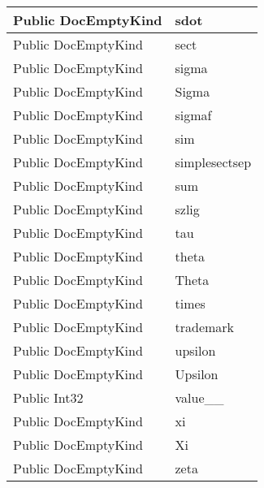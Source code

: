 \documentclass[11pt, oneside, a4paper]{book}
\begin{document}
\begin{center}
\begin{tabular}{| p{3cm} | p{12cm} | }
\hline
 Public  DocEmptyKind &  sdot\hypertarget{SoftwareEngineeringTools.{}Documentation.{}DocEmptyKind.{}sdot}{}\\
\hline
 Public  DocEmptyKind &  sect\hypertarget{SoftwareEngineeringTools.{}Documentation.{}DocEmptyKind.{}sect}{}\\
\hline
 Public  DocEmptyKind &  sigma\hypertarget{SoftwareEngineeringTools.{}Documentation.{}DocEmptyKind.{}sigma}{}\\
\hline
 Public  DocEmptyKind &  Sigma\hypertarget{SoftwareEngineeringTools.{}Documentation.{}DocEmptyKind.{}Sigma}{}\\
\hline
 Public  DocEmptyKind &  sigmaf\hypertarget{SoftwareEngineeringTools.{}Documentation.{}DocEmptyKind.{}sigmaf}{}\\
\hline
 Public  DocEmptyKind &  sim\hypertarget{SoftwareEngineeringTools.{}Documentation.{}DocEmptyKind.{}sim}{}\\
\hline
 Public  DocEmptyKind &  simplesectsep\hypertarget{SoftwareEngineeringTools.{}Documentation.{}DocEmptyKind.{}simplesectsep}{}\\
\hline
 Public  DocEmptyKind &  sum\hypertarget{SoftwareEngineeringTools.{}Documentation.{}DocEmptyKind.{}sum}{}\\
\hline
 Public  DocEmptyKind &  szlig\hypertarget{SoftwareEngineeringTools.{}Documentation.{}DocEmptyKind.{}szlig}{}\\
\hline
 Public  DocEmptyKind &  tau\hypertarget{SoftwareEngineeringTools.{}Documentation.{}DocEmptyKind.{}tau}{}\\
\hline
 Public  DocEmptyKind &  theta\hypertarget{SoftwareEngineeringTools.{}Documentation.{}DocEmptyKind.{}theta}{}\\
\hline
 Public  DocEmptyKind &  Theta\hypertarget{SoftwareEngineeringTools.{}Documentation.{}DocEmptyKind.{}Theta}{}\\
\hline
 Public  DocEmptyKind &  times\hypertarget{SoftwareEngineeringTools.{}Documentation.{}DocEmptyKind.{}times}{}\\
\hline
 Public  DocEmptyKind &  trademark\hypertarget{SoftwareEngineeringTools.{}Documentation.{}DocEmptyKind.{}trademark}{}\\
\hline
 Public  DocEmptyKind &  upsilon\hypertarget{SoftwareEngineeringTools.{}Documentation.{}DocEmptyKind.{}upsilon}{}\\
\hline
 Public  DocEmptyKind &  Upsilon\hypertarget{SoftwareEngineeringTools.{}Documentation.{}DocEmptyKind.{}Upsilon}{}\\
\hline
 Public  Int32 &  value\_\_\hypertarget{SoftwareEngineeringTools.{}Documentation.{}DocEmptyKind.{}value\_\_}{}\\
\hline
 Public  DocEmptyKind &  xi\hypertarget{SoftwareEngineeringTools.{}Documentation.{}DocEmptyKind.{}xi}{}\\
\hline
 Public  DocEmptyKind &  Xi\hypertarget{SoftwareEngineeringTools.{}Documentation.{}DocEmptyKind.{}Xi}{}\\
\hline
 Public  DocEmptyKind &  zeta\hypertarget{SoftwareEngineeringTools.{}Documentation.{}DocEmptyKind.{}zeta}{}\\
\hline
\end{tabular}
\end{center}
\end{document}
